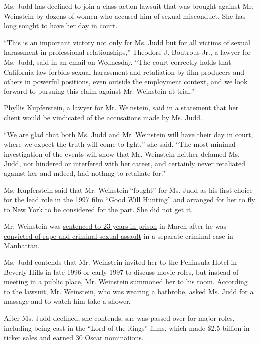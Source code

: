 Ms. Judd has declined to join a class-action lawsuit that was brought
against Mr. Weinstein by dozens of women who accused him of sexual
misconduct. She has long sought to have her day in court.

``This is an important victory not only for Ms. Judd but for all victims
of sexual harassment in professional relationships,'' Theodore J.
Boutrous Jr., a lawyer for Ms. Judd, said in an email on Wednesday.
``The court correctly holds that California law forbids sexual
harassment and retaliation by film producers and others in powerful
positions, even outside the employment context, and we look forward to
pursuing this claim against Mr. Weinstein at trial.''

Phyllis Kupferstein, a lawyer for Mr. Weinstein, said in a statement
that her client would be vindicated of the accusations made by Ms. Judd.

``We are glad that both Ms. Judd and Mr. Weinstein will have their day
in court, where we expect the truth will come to light,'' she said.
``The most minimal investigation of the events will show that Mr.
Weinstein neither defamed Ms. Judd, nor hindered or interfered with her
career, and certainly never retaliated against her and indeed, had
nothing to retaliate for.''

Ms. Kupferstein said that Mr. Weinstein ``fought'' for Ms. Judd as his
first choice for the lead role in the 1997 film ``Good Will Hunting''
and arranged for her to fly to New York to be considered for the part.
She did not get it.

Mr. Weinstein was
\href{https://www.nytimes3xbfgragh.onion/2020/03/11/nyregion/harvey-weinstein-sentencing.html}{sentenced
to 23 years in prison} in March after he was
\href{https://www.nytimes3xbfgragh.onion/2020/02/24/nyregion/harvey-weinstein-verdict.html}{convicted
of rape and criminal sexual assault} in a separate criminal case in
Manhattan.

Ms. Judd contends that Mr. Weinstein invited her to the Peninsula Hotel
in Beverly Hills in late 1996 or early 1997 to discuss movie roles, but
instead of meeting in a public place, Mr. Weinstein summoned her to his
room. According to the lawsuit, Mr. Weinstein, who was wearing a
bathrobe, asked Ms. Judd for a massage and to watch him take a shower.

After Ms. Judd declined, she contends, she was passed over for major
roles, including being cast in the ``Lord of the Rings'' films, which
made \$2.5 billion in ticket sales and earned 30 Oscar nominations.

